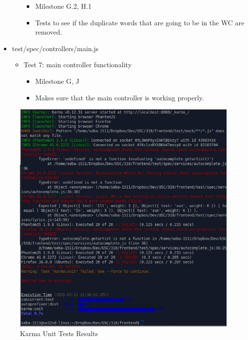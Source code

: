 \documentclass[]{article}
\begin{document}
\begin{itemize}
\begin{itemize}
    \begin{itemize}
    \itemsep1pt\parskip0pt
    \item
      Milestone G.2, H.1
    \item
      Tests to see if the duplicate words that are going to be in the WC
      are removed.
    \end{itemize}
  \end{itemize}
\item
  test/spec/controllers/main.js

  \begin{itemize}
  \itemsep1pt\parskip0pt
  \item
    Test 7: main controller functionality

    \begin{itemize}
    \itemsep1pt\parskip0pt
    \item
      Milestone G, J
    \item
      Makes sure that the main controller is working properly.
    \end{itemize}
  \end{itemize}
\end{itemize}

\begin{figure}[htbp]
\centering
\includegraphics{karma.png}
\caption{Karma Unit Tests Results}
\end{figure}
\end{document}
